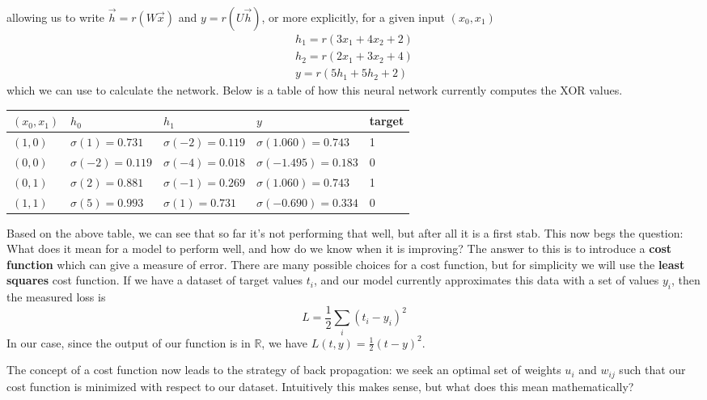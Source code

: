 \documentclass[12pt,letterpaper]{book}
\theoremstyle{definition}
\begin{document}
  allowing us to write $\vec{h} = r(W\vec{x})$ and $y = r(U\vec{h})$, 
  or more explicitly, for a given input $(x_0, x_1)$
  \begin{align}
    h_1 = r(3x_1 + 4x_2 + 2)\\
    h_2 = r(2x_1 + 3x_2 + 4)\\
    y = r(5h_1 + 5h_2 + 2)
  \end{align}
  which we can use to calculate the network.
  Below is a table of how this neural network currently computes the XOR values.
  \begin{center}
    \begin{tabular}{ |p{1.5cm}||p{3cm}|p{3cm}|p{3.5cm}|p{1.5cm}| }
      \hline
      $(x_0, x_1)$ & $h_0$ & $h_1$ & $y$ & target\\
      \hline
      $(1, 0)$ & $\sigma(1) = 0.731$ & $\sigma(-2) = 0.119$ & $\sigma(1.060) = 0.743$ & 1 \\
      \hline
      $(0, 0)$ & $\sigma(-2) = 0.119$ & $\sigma(-4) = 0.018$ & $\sigma(-1.495) = 0.183$  & 0\\
      \hline
      $(0, 1)$ & $\sigma(2) = 0.881$ & $\sigma(-1) = 0.269$ & $\sigma(1.060) = 0.743$ & 1 \\
      \hline
      $(1, 1)$ & $\sigma(5) = 0.993$ & $\sigma(1) = 0.731$ & $\sigma(-0.690) = 0.334$ & 0\\
      \hline
     \end{tabular}
     
  \end{center}
  Based on the above table, we can see that so far it's not performing that well, but after 
  all it is a first stab. This now begs the question: What does it 
  mean for a model to perform well, and how do we know when it is improving? The answer
  to this is to introduce a \textbf{cost function} which can give a measure of error. There are 
  many possible choices for a cost function, but for simplicity we will use the \textbf{least squares}
  cost function. If we have a dataset of target values $t_i$, and our model currently 
  approximates this data with a set of values $y_i$, then the measured loss is 
  \[
      L = \frac{1}{2}\sum_{i}(t_i - y_i)^2
  \] 
  In our case, since the output of our function is in $\mathbb{R}$, we have 
  $L(t, y) = \frac{1}{2}(t - y)^2$. 

  The concept of a cost function now leads to the strategy of back propagation:
  we seek an optimal set of weights $u_i$ and $w_{ij}$ such that 
  our cost function is minimized with respect to our dataset. 
  Intuitively this makes sense, but what does this mean mathematically?
\end{document}
